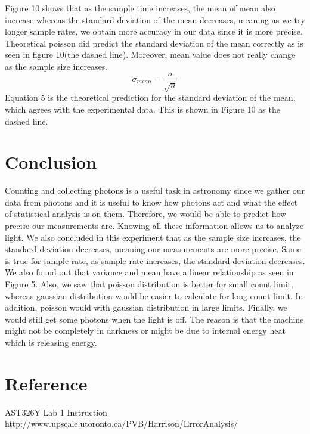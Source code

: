 \documentclass[letterpaper,12pt]{article}
\begin{document}
\newpage
Figure 10 shows that as the sample time increases, the mean of mean also increase whereas the standard deviation of the mean decreases, meaning as we try longer sample rates, we obtain more accuracy in our data since it is more precise. Theoretical poisson did predict the standard deviation of the mean correctly as is seen in figure 10(the dashed line). Moreover, mean value does not really change as the sample size increases.
\begin{equation}
\label{sigma}
\sigma_{mean}= \frac{\sigma}{\sqrt{n}}
\end{equation}
Equation 5 is the theoretical prediction for the standard deviation of the mean, which agrees with the experimental data. This is shown in Figure 10 as the dashed line.

\newpage
\section{Conclusion}
\label{sec:conclusion}
Counting and collecting photons is a useful task in astronomy since we gather our data from photons and it is useful to know how photons act and what the effect of statistical analysis is on them. Therefore, we would be able to predict how precise our measurements are. Knowing all these information allows us to analyze light.
We also concluded in this experiment that as the sample size increases, the standard deviation decreases, meaning our measurements are more precise. Same is true for sample rate, as sample rate increases, the standard deviation decreases. We also found out that variance and mean have a linear relationship as seen in Figure 5.
Also, we saw that poisson distribution is better for small count limit, whereas gaussian distribution would be easier to calculate for long count limit. In addition, poisson would  with gaussian distribution in large limits. 
Finally, we would still get some photons when the light is off. The reason is that the machine might not be completely in darkness or might be due to internal energy heat which is releasing energy.

\section{Reference}
\label{sec:reference}

AST326Y Lab 1 Instruction
\newline
http://www.upscale.utoronto.ca/PVB/Harrison/ErrorAnalysis/
\end{document}
